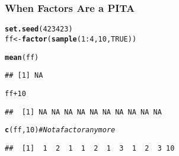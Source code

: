 \documentclass[paper=screen,mathserif]{beamer}\usepackage[]{graphicx}\usepackage[]{color}
\makeatletter
\newcommand{\hlnum}[1]{\textcolor[rgb]{0.686,0.059,0.569}{#1}}%
\newcommand{\hlcom}[1]{\textcolor[rgb]{0.678,0.584,0.686}{\textit{#1}}}%
\newcommand{\hlopt}[1]{\textcolor[rgb]{0,0,0}{#1}}%
\newcommand{\hlstd}[1]{\textcolor[rgb]{0.345,0.345,0.345}{#1}}%
\newcommand{\hlkwb}[1]{\textcolor[rgb]{0.69,0.353,0.396}{#1}}%
\newcommand{\hlkwd}[1]{\textcolor[rgb]{0.737,0.353,0.396}{\textbf{#1}}}%
\newenvironment{kframe}{%
 \def\at@end@of@kframe{}%
 \ifinner\ifhmode%
  \def\at@end@of@kframe{\end{minipage}}%
  \begin{minipage}{\columnwidth}%
 \fi\fi%
 \def\FrameCommand##1{\hskip\@totalleftmargin \hskip-\fboxsep
 \colorbox{shadecolor}{##1}\hskip-\fboxsep
     \hskip-\linewidth \hskip-\@totalleftmargin \hskip\columnwidth}%
 \MakeFramed {\advance\hsize-\width
   \@totalleftmargin\z@ \linewidth\hsize
   \@setminipage}}%
 {\par\unskip\endMakeFramed%
 \at@end@of@kframe}
\newenvironment{knitrout}{}{} %
\newcommand{\ft}[1]{\frametitle{#1}}
\makeatother
\begin{document}
\begin{frame}[fragile]
  \ft{When Factors Are a PITA}
\begin{knitrout}\scriptsize
{}\color{fgcolor}\begin{kframe}
\begin{alltt}
\hlkwd{set.seed}\hlstd{(}\hlnum{423423}\hlstd{)}
\hlstd{ff} \hlkwb{<-} \hlkwd{factor}\hlstd{(}\hlkwd{sample}\hlstd{(}\hlnum{1}\hlopt{:}\hlnum{4}\hlstd{,} \hlnum{10}\hlstd{,} \hlnum{TRUE}\hlstd{))}
\end{alltt}
\end{kframe}
\end{knitrout}
\begin{knitrout}\scriptsize
{}\color{fgcolor}\begin{kframe}
\begin{alltt}
\hlkwd{mean}\hlstd{(ff)}
\end{alltt}


{\ttfamily\noindent\color{warningcolor}{\#\# Warning in mean.default(ff): argument is not numeric or logical: returning NA}}\begin{verbatim}
## [1] NA
\end{verbatim}
\begin{alltt}
\hlstd{ff} \hlopt{+} \hlnum{10}
\end{alltt}


{\ttfamily\noindent\color{warningcolor}{\#\# Warning in Ops.factor(ff, 10): '+' not meaningful for factors}}\begin{verbatim}
##  [1] NA NA NA NA NA NA NA NA NA NA
\end{verbatim}
\begin{alltt}
\hlkwd{c}\hlstd{(ff,} \hlnum{10}\hlstd{)} \hlcom{# Not a factor anymore}
\end{alltt}
\begin{verbatim}
##  [1]  1  2  1  1  2  1  3  1  2  3 10
\end{verbatim}
\end{kframe}
\end{knitrout}
\end{frame}
  
\end{document}
